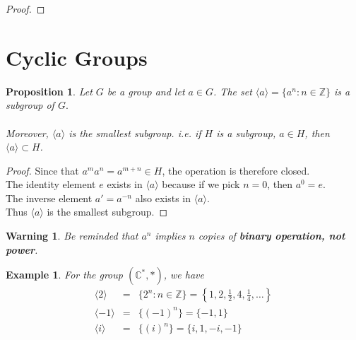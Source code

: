 \documentclass{article}
\theoremstyle{MyNonumberplain}
\theoremstyle{break}
\newtheorem*{proof}{Proof. }
\newcommand{\C}{\mathbb{C}}
\newcommand{\cyclic}[1]{\langle #1 \rangle}
\newtheorem{warning}{Warning}[section]
\theoremstyle{break}
\newtheorem{proposition}{Proposition}[section]
\newtheorem{example}{Example}[section]
\theoremstyle{break}
\theoremstyle{definition}
\theoremstyle{break}
\begin{document}
\begin{thmbox}
\begin{prfbox}
\begin{proof}
        \end{proof}
    \end{prfbox}
    
\end{thmbox}

\newpage

\section{Cyclic Groups}

\begin{thmbox}
    \begin{proposition}
        Let $G$ be a group and let $a \in G$. The set $\langle a \rangle = \{ a^n : n \in \mathbb{Z} \}$ is a subgroup of $G.$\\\\
        Moreover, $\langle a \rangle$ is the smallest subgroup. i.e. if $H$ is a subgroup, $a \in H$, then $\langle a \rangle \subset H$.
    \end{proposition}
    \begin{prfbox}
        \begin{proof}
            Since that $a^m a^n = a^{m + n} \in H$, the operation is therefore closed.\\
    
            The identity element $e$ exists in $\langle a \rangle$ because if we pick $n = 0$, then
            $a^0 = e$.\\
    
            The inverse element $a' = a^{- n}$ also exists in $\langle a \rangle$.\\
    
            Thus $\langle a \rangle$ is the smallest subgroup.
        \end{proof}
    \end{prfbox}    
\end{thmbox}

\begin{warnbox}
    \begin{warning}
        Be reminded that $a^n$ implies $n$ copies of \textbf{binary operation, not
        power}.
    \end{warning}
\end{warnbox}


\begin{expbox}
    \begin{example}
        For the group $(\C^*,*)$, we have
        \begin{eqnarray} 
            \langle 2 \rangle & = & \{ 2^n : n \in \mathbb{Z} \} = \left\{ 1, 2, \frac{1}{2}, 4, \frac{1}{4}, \ldots \right\} \nonumber\\
            \cyclic{-1} & = & \{(-1)^n\}=\{-1,1\} \nonumber\\
            \cyclic{i}  & = & \{(i)^n\} = \{i,1,-i,-1\} \nonumber
        \end{eqnarray}
    \end{example}
\end{expbox}
\end{document}

